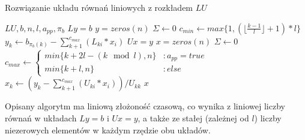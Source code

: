 \documentclass[11pt]{article}
\begin{document}
        \begin{algorithm}[h!]
        \caption{Rozwiązanie układu równań liniowych z rozkładem $LU$}
        \label{alg:solve_equation_system_lu}
        \begin{algorithmic}[1]
            \Require $LU, b, n, l, a_{pp}, \pi_b$
            \State \Comment $Ly = b$
            \State $y = zeros(n)$
                \State $\Sigma \gets 0$
                \State $c_{min} \gets max\{1, (\lfloor \frac{k - 1}{l} \rfloor + 1) * l\}$
                \State $y_k \gets b_{\pi_b(k)} - \sum_{k + 1}^{c_{max}}(L_{ki} * x_i)$
            \EndFor
            \State
            \State \Comment $Ux = y$
            \State $x = zeros(n)$
                \State $\Sigma \gets 0$
                \State
                $
                c_{max} \gets
                \begin{cases}
                    min\{k + 2l - (k \mod l), n\} & : a_{pp} = true \\
                    min\{k + l, n\} & : else
                \end{cases}
                $
                \State $x_k \gets (y_k - \sum_{k + 1}^{c_{max}}(U_{ki} * x_i)) / U_{kk}$
            \EndFor
            \State \Return $x$
        \end{algorithmic}
        \end{algorithm}

        \noindent
        Opisany algorytm ma liniową złożoność czasową, co wynika z liniowej liczby równań w układach $Ly = b$ i $Ux = y$, a także ze stałej (zależnej od $l$) liczby niezerowych elementów w każdym rzędzie obu układów.

\newpage
\end{document}
